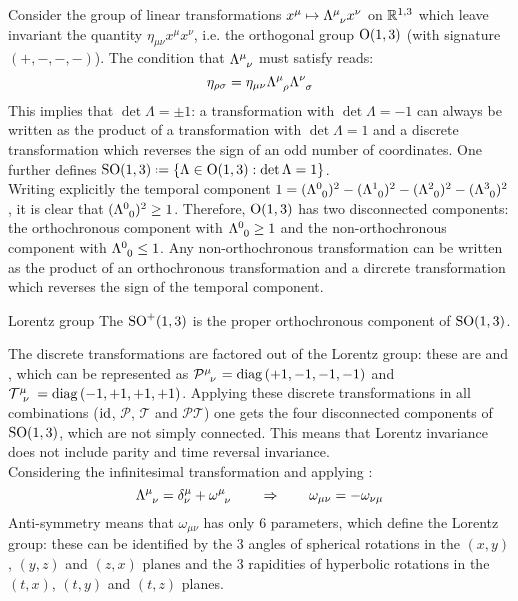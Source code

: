 Consider the group of linear transformations $ x^\mu \mapsto \tensor{\Lambda}{^\mu_\nu} x^\nu $ on $ \mathbb{R}^{1,3} $ which leave invariant the quantity $ \eta_{\mu \nu} x^\mu x^\nu $, i.e. the orthogonal group $ \mathrm{O}(1,3) $ (with signature $ (+,-,-,-) $). The condition that $ \tensor{\Lambda}{^\mu_\nu} $ must satisfy reads:
\begin{equation}
  \eta_{\rho \sigma} = \eta_{\mu \nu} \tensor{\Lambda}{^\mu_\rho} \tensor{\Lambda}{^\nu_\sigma}
  \label{eq:lor-def}
\end{equation}
This implies that $ \det \Lambda = \pm 1 $: a transformation with $ \det \Lambda = -1 $ can always be written as the product of a transformation with $ \det \Lambda = 1 $ and a discrete transformation which reverses the sign of an odd number of coordinates. One further defines $ \SOn{1,3} \defeq \{\Lambda \in \On{1,3} : \det \Lambda = 1\} $.\\
Writing explicitly the temporal component $ 1 = (\tensor{\Lambda}{^0_0})^2 - (\tensor{\Lambda}{^1_0})^2 - (\tensor{\Lambda}{^2_0})^2 - (\tensor{\Lambda}{^3_0})^2 $, it is clear that $ (\tensor{\Lambda}{^0_0})^2 \ge 1 $. Therefore, $ \mathrm{O}(1,3) $ has two disconnected components: the orthochronous component with $ \tensor{\Lambda}{^0_0} \ge 1 $ and the non-orthochronous component with $ \tensor{\Lambda}{^0_0} \le 1 $. Any non-orthochronous transformation can be written as the product of an orthochronous transformation and a dircrete transformation which reverses the sign of the temporal component.

\begin{definition}{Lorentz group}{}
  The  $ \mathrm{SO}^+(1,3) $ is the proper orthochronous component of $ \mathrm{SO}(1,3) $.
\end{definition}

The discrete transformations are factored out of the Lorentz group: these are  and , which can be represented as $ \tensor{\mathcal{P}}{^\mu_\nu} = \diag \left( +1,-1,-1,-1 \right) $ and $ \tensor{\mathcal{T}}{^\mu_\nu} = \diag \left( -1,+1,+1,+1 \right) $. Applying these discrete transformations in all combinations ($ \operatorname{id} $, $ \mathcal{P} $, $ \mathcal{T} $ and $ \mathcal{P} \mathcal{T} $) one gets the four disconnected components of $ \mathrm{SO}(1,3) $, which are not simply connected. This means that Lorentz invariance does not include parity and time reversal invariance.\\
Considering the infinitesimal transformation and applying :
\begin{equation*}
  \tensor{\Lambda}{^\mu_\nu} = \delta^\mu_\nu + \tensor{\omega}{^\mu_\nu}
  \qquad \Rightarrow \qquad
  \omega_{\mu \nu} = - \omega_{\nu \mu}
\end{equation*}
Anti-symmetry means that $ \omega_{\mu \nu} $ has only 6 parameters, which define the Lorentz group: these can be identified by the 3 angles of spherical rotations in the $ (x,y) $, $ (y,z) $ and $ (z,x) $ planes and the 3 rapidities of hyperbolic rotations in the $ (t,x) $, $ (t,y) $ and $ (t,z) $ planes.

